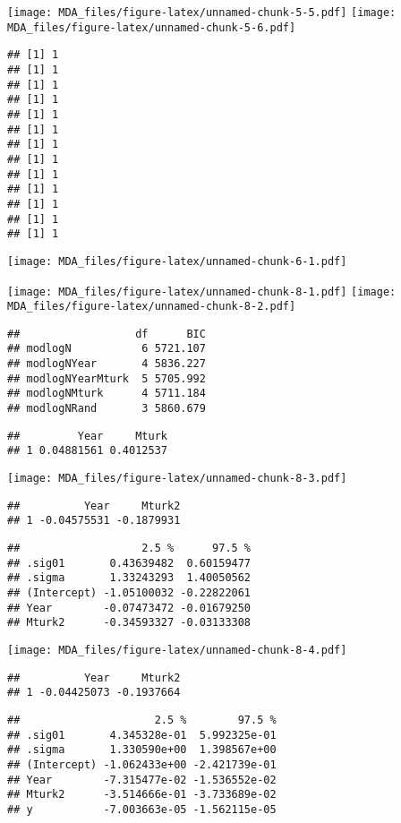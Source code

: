 \documentclass[
]{article}
\begin{document}
\texttt{[image: MDA\_files/figure-latex/unnamed-chunk-5-5.pdf]}
\texttt{[image: MDA\_files/figure-latex/unnamed-chunk-5-6.pdf]}

\begin{verbatim}
## [1] 1
## [1] 1
## [1] 1
## [1] 1
## [1] 1
## [1] 1
## [1] 1
## [1] 1
## [1] 1
## [1] 1
## [1] 1
## [1] 1
## [1] 1
\end{verbatim}

\texttt{[image: MDA\_files/figure-latex/unnamed-chunk-6-1.pdf]}

\texttt{[image: MDA\_files/figure-latex/unnamed-chunk-8-1.pdf]}
\texttt{[image: MDA\_files/figure-latex/unnamed-chunk-8-2.pdf]}

\begin{verbatim}
##                  df      BIC
## modlogN           6 5721.107
## modlogNYear       4 5836.227
## modlogNYearMturk  5 5705.992
## modlogNMturk      4 5711.184
## modlogNRand       3 5860.679
\end{verbatim}

\begin{verbatim}
##         Year     Mturk
## 1 0.04881561 0.4012537
\end{verbatim}

\texttt{[image: MDA\_files/figure-latex/unnamed-chunk-8-3.pdf]}

\begin{verbatim}
##          Year     Mturk2
## 1 -0.04575531 -0.1879931
\end{verbatim}

\begin{verbatim}
##                   2.5 %      97.5 %
## .sig01       0.43639482  0.60159477
## .sigma       1.33243293  1.40050562
## (Intercept) -1.05100032 -0.22822061
## Year        -0.07473472 -0.01679250
## Mturk2      -0.34593327 -0.03133308
\end{verbatim}

\texttt{[image: MDA\_files/figure-latex/unnamed-chunk-8-4.pdf]}

\begin{verbatim}
##          Year     Mturk2
## 1 -0.04425073 -0.1937664
\end{verbatim}

\begin{verbatim}
##                     2.5 %        97.5 %
## .sig01       4.345328e-01  5.992325e-01
## .sigma       1.330590e+00  1.398567e+00
## (Intercept) -1.062433e+00 -2.421739e-01
## Year        -7.315477e-02 -1.536552e-02
## Mturk2      -3.514666e-01 -3.733689e-02
## y           -7.003663e-05 -1.562115e-05
\end{verbatim}
\end{document}
